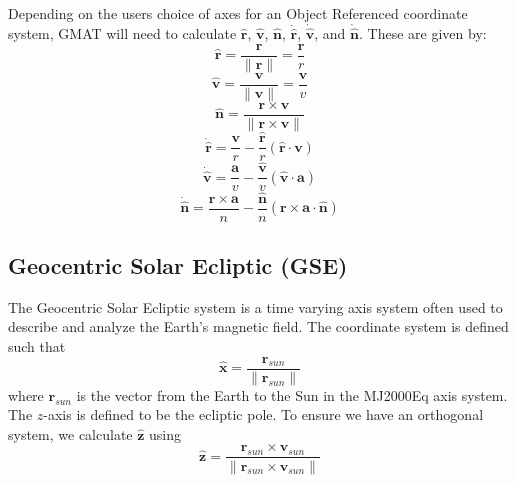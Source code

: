 {Depending on the users choice of axes for an Object Referenced
coordinate system, GMAT will need to calculate $\hat{\mathbf{r}}$,
$\hat{\mathbf{v}}$, $\hat{\mathbf{n}}$, $\dot{\hat{\mathbf{r}}}$,
$\dot{\hat{\mathbf{v}}}$, and $\dot{\hat{\mathbf{n}}}$.  These are
given by:
%
\begin{equation}
\hat{\mathbf{r}} = \frac{\mathbf{r}}{\| \mathbf{r}
     \|} = \frac{\mathbf{r}}{r}
\end{equation}
%
\begin{equation}
     \hat{\mathbf{v}} = \frac{\mathbf{v}}{\| \mathbf{v}
     \|} = \frac{\mathbf{v}}{v}
\end{equation}
%
\begin{equation}
     \hat{\mathbf{n}} = \frac{\mathbf{r}\times \mathbf{v}}{ \| \mathbf{r}\times \mathbf{v}
     \|}
\end{equation}
%
\begin{equation}
    \dot{\hat{\mathbf{r}}} = \frac{\mathbf{v}}{r}  -
     \frac{\hat{\mathbf{r}}}{r}
     \left(\hat{\mathbf{r}} \cdot
     \mathbf{v} \right)
\end{equation}
%
\begin{equation}
    \dot{\hat{\mathbf{v}}} = \frac{\mathbf{a}}{v} -
    \frac{\hat{\mathbf{v}}}{v}\left(\hat{\mathbf{v}}\cdot\mathbf{a}\right)
\end{equation}
%
\begin{equation}
     \dot{\hat{\mathbf{n}}} = \frac{\mathbf{r} \times \mathbf{a}}{n} - \frac{\hat{\mathbf{n}}}{n} \left(  \mathbf{r}\times\mathbf{a} \cdot \hat{\mathbf{n}} \right)
     \label{Eq:VBN_Ndot}
\end{equation}



\subsection{Geocentric Solar
Ecliptic (GSE)  }

The Geocentric Solar Ecliptic system is a time varying axis system
often used to describe and analyze the Earth's magnetic field. The
coordinate system is defined such that
%
\begin{equation}
     \hat{\mathbf{x}} = \frac{\mathbf{r}_{sun}}{\| \mathbf{r}_{sun} \|}
\end{equation}
%
where $\mathbf{r}_{sun}$ is the vector from the Earth to the Sun
in the MJ2000Eq axis system.   The $z$-axis is defined to be the
ecliptic pole. To ensure we have an orthogonal system, we
calculate $\hat{\mathbf{z}}$ using
%
\begin{equation}
     \hat{\mathbf{z}} = \frac{\mathbf{r}_{sun} \times \mathbf{v}_{sun}}{ \|  \mathbf{r}_{sun} \times \mathbf{v}_{sun}   \|}
\end{equation}


}
